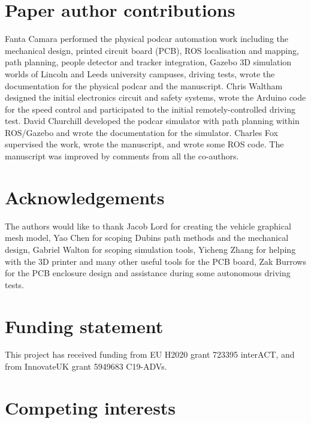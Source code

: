 \documentclass[a4paper]{article}
\begin{document}
	
	\section*{Paper author contributions}\label{h.fy8hbipy6kwe}
	
	Fanta Camara performed the physical podcar automation work including the mechanical design, printed circuit board (PCB), ROS localisation and mapping, path planning, people detector and tracker integration, Gazebo 3D simulation worlds of Lincoln and Leeds university campuses, driving tests, wrote the documentation for the physical podcar and the manuscript. Chris Waltham designed the initial electronics circuit and safety systems, wrote the Arduino code for the speed control and participated to the initial remotely-controlled driving test. David Churchill developed the podcar simulator with path planning within ROS/Gazebo and wrote the documentation for the simulator. Charles Fox supervised the work, wrote the manuscript, and wrote some ROS code. The manuscript was improved by comments from all the co-authors.
	
	
	\section*{Acknowledgements}\label{h.gu3yyarx72d6}
	
	The authors would like to thank Jacob Lord for creating the vehicle graphical mesh model, Yao Chen for scoping Dubins path methods and the mechanical design, Gabriel Walton for scoping simulation tools, Yicheng Zhang for helping with the 3D printer and many other useful tools for the PCB board, Zak Burrows for the PCB enclosure design and assistance during some autonomous driving tests.
	
	
	\section*{Funding statement}\label{h.4u1a7tugh2om}
	
	
	This project has received funding from EU H2020 grant 723395 interACT, and from InnovateUK  grant 5949683 C19-ADVs.
	
	
	\section*{Competing interests}\label{h.q1j1rznb43fl}
	
\end{document}
